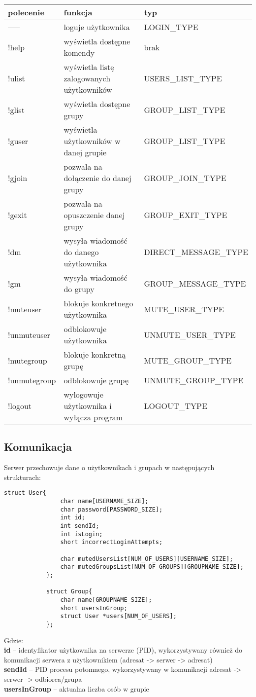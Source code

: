 \documentclass[11pt]{article}
\begin{document}
\begin{table}[!ht]
	\centering
	\begin{tabular}{|l|l|l|}
		\hline
		\textbf{polecenie} & \textbf{funkcja} & \textbf{typ} \\ \hline
		----- & loguje użytkownika & LOGIN\_TYPE \\ \hline
		!help & wyświetla dostępne komendy & brak \\ \hline
		!ulist & wyświetla listę zalogowanych użytkowników & USERS\_LIST\_TYPE \\ \hline
		!glist & wyświetla dostępne grupy & GROUP\_LIST\_TYPE \\ \hline
		!guser & wyświetla użytkowników w danej grupie & GROUP\_LIST\_TYPE \\ \hline
		!gjoin & pozwala na dołączenie do danej grupy & GROUP\_JOIN\_TYPE \\ \hline
		!gexit & pozwala na opuszczenie danej grupy & GROUP\_EXIT\_TYPE \\ \hline
		!dm & wysyła wiadomość do danego użytkownika& DIRECT\_MESSAGE\_TYPE \\ \hline
		!gm & wysyła wiadomość do grupy & GROUP\_MESSAGE\_TYPE \\ \hline
		!muteuser & blokuje konkretnego użytkownika & MUTE\_USER\_TYPE \\ \hline
		!unmuteuser & odblokowuje użytkownika & UNMUTE\_USER\_TYPE \\ \hline
		!mutegroup & blokuje konkretną grupę & MUTE\_GROUP\_TYPE \\ \hline
		!unmutegroup & odblokowuje grupę & UNMUTE\_GROUP\_TYPE \\ \hline
		!logout & wylogowuje użytkownika i wyłącza program & LOGOUT\_TYPE\\ \hline
	\end{tabular}
\end{table}
\pagebreak
	\subsection{Komunikacja}
	Serwer przechowuje dane o użytkownikach i grupach w następujących strukturach:
		\begin{lstlisting}[style = CStyle]
			struct User{
				char name[USERNAME_SIZE];
				char password[PASSWORD_SIZE];
				int id;
				int sendId;
				int isLogin;
				short incorrectLoginAttempts;
				
				char mutedUsersList[NUM_OF_USERS][USERNAME_SIZE];
				char mutedGroupsList[NUM_OF_GROUPS][GROUPNAME_SIZE];
			};
		
			struct Group{
				char name[GROUPNAME_SIZE];
				short usersInGroup;
				struct User *users[NUM_OF_USERS];
			};
		\end{lstlisting}
	Gdzie:\\
	\textbf{id} – identyfikator użytkownika na serwerze (PID), wykorzystywany również do komunikacji serwera z użytkownikiem (adresat -> serwer -> adresat)\\
	\textbf{sendId} – PID procesu potomnego, wykorzystywany w komunikacji adresat -> serwer -> odbiorca/grupa\\
	\textbf{usersInGroup} – aktualna liczba osób w grupie\\\\
	
\end{document}
